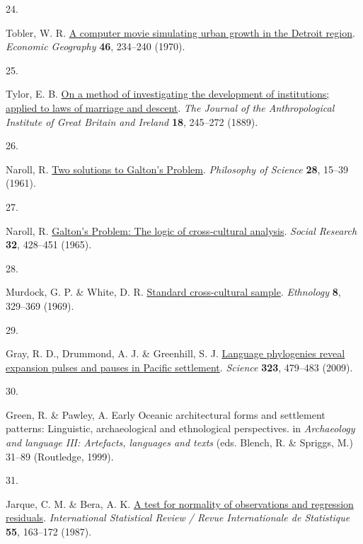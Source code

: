 \documentclass[
  man,floatsintext]{apa6}
\newlength{\cslhangindent}
\newlength{\csllabelwidth}
\newlength{\cslentryspacingunit} %
\newenvironment{CSLReferences}[2] %
 {%
  \setlength{\parindent}{0pt}
  \ifodd #1
  \let\oldpar\par
  \def\par{\hangindent=\cslhangindent\oldpar}
  \fi
  \setlength{\parskip}{#2\cslentryspacingunit}
 }%
 {}
\newcommand{\CSLLeftMargin}[1]{\parbox[t]{\csllabelwidth}{#1}}
\newcommand{\CSLRightInline}[1]{\parbox[t]{\linewidth - \csllabelwidth}{#1}\break}
\begin{document}
\begin{CSLReferences}{0}{0}
\leavevmode{}%
\CSLLeftMargin{24. }%
\CSLRightInline{Tobler, W. R. \href{https://doi.org/10.2307/143141}{A computer movie simulating urban growth in the {D}etroit region}. \emph{Economic Geography} \textbf{46}, 234--240 (1970).}

\leavevmode{}%
\CSLLeftMargin{25. }%
\CSLRightInline{Tylor, E. B. \href{https://doi.org/10.2307/2842423}{On a method of investigating the development of institutions; applied to laws of marriage and descent}. \emph{The Journal of the Anthropological Institute of Great Britain and Ireland} \textbf{18}, 245--272 (1889).}

\leavevmode{}%
\CSLLeftMargin{26. }%
\CSLRightInline{Naroll, R. \href{https://doi.org/10.1086/287778}{Two solutions to {G}alton's {P}roblem}. \emph{Philosophy of Science} \textbf{28}, 15--39 (1961).}

\leavevmode{}%
\CSLLeftMargin{27. }%
\CSLRightInline{Naroll, R. \href{http://www.jstor.org/stable/40969817}{Galton's {P}roblem: The logic of cross-cultural analysis}. \emph{Social Research} \textbf{32}, 428--451 (1965).}

\leavevmode{}%
\CSLLeftMargin{28. }%
\CSLRightInline{Murdock, G. P. \& White, D. R. \href{https://doi.org/10.2307/3772907}{Standard cross-cultural sample}. \emph{Ethnology} \textbf{8}, 329--369 (1969).}

\leavevmode{}%
\CSLLeftMargin{29. }%
\CSLRightInline{Gray, R. D., Drummond, A. J. \& Greenhill, S. J. \href{https://doi.org/10.1126/science.1166858}{Language phylogenies reveal expansion pulses and pauses in {Pacific} settlement}. \emph{Science} \textbf{323}, 479--483 (2009).}

\leavevmode{}%
\CSLLeftMargin{30. }%
\CSLRightInline{Green, R. \& Pawley, A. Early {Oceanic} architectural forms and settlement patterns: Linguistic, archaeological and ethnological perspectives. in \emph{Archaeology and language {III}: Artefacts, languages and texts} (eds. Blench, R. \& Spriggs, M.) 31--89 (Routledge, 1999).}

\leavevmode{}%
\CSLLeftMargin{31. }%
\CSLRightInline{Jarque, C. M. \& Bera, A. K. \href{https://doi.org/10.2307/1403192}{A test for normality of observations and regression residuals}. \emph{International Statistical Review / Revue Internationale de Statistique} \textbf{55}, 163--172 (1987).}


\end{CSLReferences}
\end{document}
